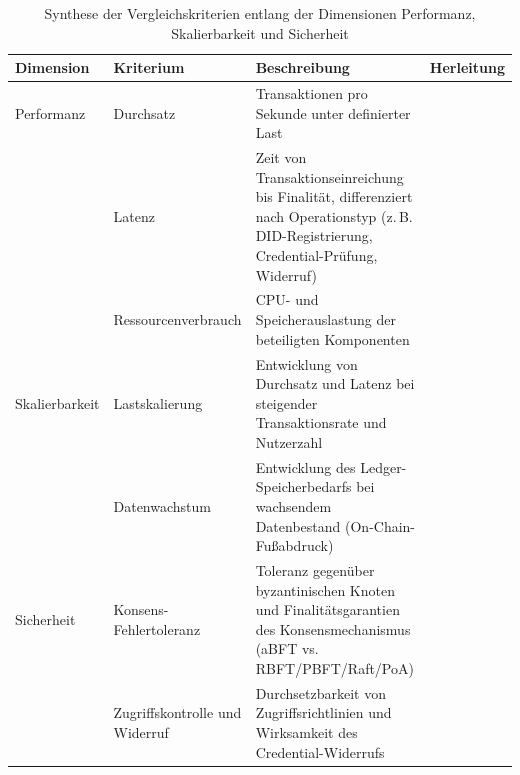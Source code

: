 \begin{table}[htbp]
\centering
\scriptsize
\renewcommand{\arraystretch}{1.15}
\caption{Synthese der Vergleichskriterien entlang der Dimensionen
Performanz, Skalierbarkeit und Sicherheit}
\begin{tabular}{p{2.2cm}p{3.6cm}p{4.6cm}p{2.8cm}}
\toprule
\textbf{Dimension} & \textbf{Kriterium} & \textbf{Beschreibung} &
\textbf{Herleitung} \\
\midrule
Performanz & Durchsatz & Transaktionen pro Sekunde unter definierter Last &
\cite{tawfik2025, verma2024, minango2025, hashim2021} \\
& Latenz & Zeit von Transaktionseinreichung bis Finalität, differenziert
nach Operationstyp (z.\,B. DID-Registrierung, Credential-Prüfung,
Widerruf) & \cite{manoj2022, torongo2023, mamoru2026, hashim2021} \\
& Ressourcenverbrauch & CPU- und Speicherauslastung der beteiligten
Komponenten & \cite{minango2025, amanat2022} \\
\midrule
Skalierbarkeit & Lastskalierung & Entwicklung von Durchsatz und Latenz bei
steigender Transaktionsrate und Nutzerzahl & \cite{joshimahajan2025,
chainarong2025, mazlan2020, sehimibendaoud2023} \\
& Datenwachstum & Entwicklung des Ledger-Speicherbedarfs bei wachsendem
Datenbestand (On-Chain-Fußabdruck) & \cite{giao2026, mamoru2026} \\
\midrule
Sicherheit & Konsens-Fehlertoleranz & Toleranz gegenüber byzantinischen
Knoten und Finalitätsgarantien des Konsensmechanismus (aBFT vs.
RBFT/PBFT/Raft/PoA) & \cite{verma2024, tawfik2025, farin2025} \\
& Zugriffskontrolle und Widerruf & Durchsetzbarkeit von
Zugriffsrichtlinien und Wirksamkeit des Credential-Widerrufs &
\cite{torongo2023, mamoru2026} \\
\bottomrule
\end{tabular}
\label{tab:synthese_vergleichskriterien}
\end{table}

